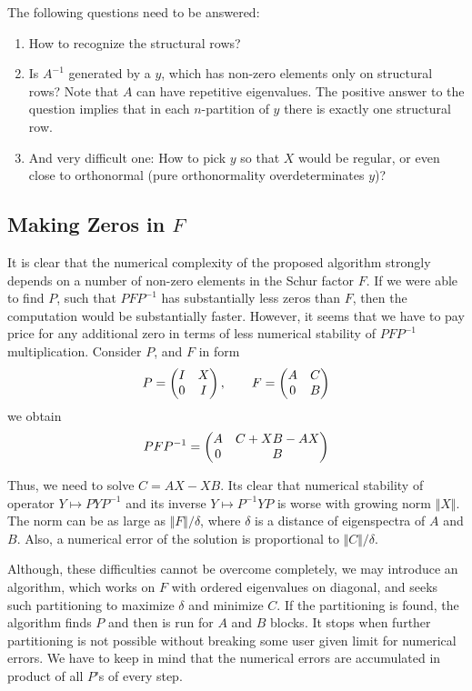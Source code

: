 \documentclass[11pt,a4paper]{article}
\begin{document}
The following questions need to be answered:
\begin{enumerate}
\item How to recognize the structural rows?
\item Is $A^{-1}$ generated by a $y$, which has non-zero elements only
on structural rows? Note that $A$ can have repetitive eigenvalues. The
positive answer to the question implies that in each $n$-partition of
$y$ there is exactly one structural row.
\item And very difficult one: How to pick $y$ so that $X$ would be
regular, or even close to orthonormal (pure orthonormality
overdeterminates $y$)?
\end{enumerate}

\subsection{Making Zeros in $F$}

It is clear that the numerical complexity of the proposed algorithm
strongly depends on a number of non-zero elements in the Schur factor
$F$. If we were able to find $P$, such that $PFP^{-1}$ has
substantially less zeros than $F$, then the computation would be
substantially faster. However, it seems that we have to pay price for
any additional zero in terms of less numerical stability of $PFP^{-1}$
multiplication. Consider $P$, and $F$ in form
$$P=\begin{pmatrix} I &X\cr 0&I\end{pmatrix},
\qquad F=\begin{pmatrix} A&C\cr 0&B\end{pmatrix}$$
we obtain
$$PFP^{-1}=\begin{pmatrix} A& C + XB - AX\cr 0&B \end{pmatrix}$$

Thus, we need to solve $C = AX - XB$. Its clear that numerical
stability of operator $Y\mapsto PYP^{-1}$ and its inverse $Y\mapsto
P^{-1}YP$ is worse with growing norm $\Vert X\Vert$. The norm can be
as large as $\Vert F\Vert/\delta$, where $\delta$ is a distance of
eigenspectra of $A$ and $B$. Also, a numerical error of the solution is
proportional to $\Vert C\Vert/\delta$.

Although, these difficulties cannot be overcome completely, we may
introduce an algorithm, which works on $F$ with ordered eigenvalues on
diagonal, and seeks such partitioning to maximize $\delta$ and
minimize $C$. If the partitioning is found, the algorithm finds $P$
and then is run for $A$ and $B$ blocks. It stops when further
partitioning is not possible without breaking some user given limit
for numerical errors. We have to keep in mind that the numerical
errors are accumulated in product of all $P$'s of every step.
\end{document}
